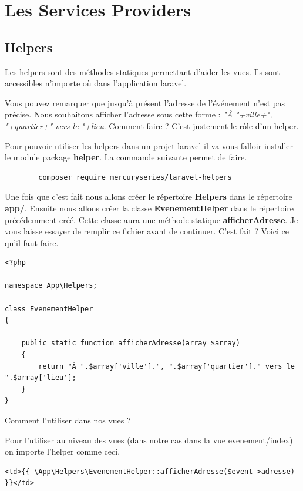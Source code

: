 \documentclass[12pt,a4paper]{article}
\begin{document}
\section{Les Services Providers}

\subsection{Helpers}
Les helpers sont des méthodes statiques permettant d'aider les vues. Ils sont accessibles n'importe où dans l'application laravel.\par
Vous pouvez remarquer que jusqu’à  présent l'adresse de l'événement n'est pas précise.
Nous souhaitons afficher l'adresse sous cette forme : \textit{"À "+ville+", "+quartier+" vers le "+lieu}. Comment faire ? C'est justement le rôle d'un helper.\par
Pour pouvoir utiliser les helpers dans un projet laravel il va vous falloir installer le module package \textbf{helper}. La commande suivante permet de faire.\\

\begin{verbatim}
        composer require mercuryseries/laravel-helpers
\end{verbatim}

Une fois que c'est fait nous allons créer le répertoire \textbf{Helpers} dans le répertoire
\textbf{app/}. Ensuite nous allons créer la classe \textbf{EvenementHelper} dans le répertoire précédemment créé.  Cette classe aura une méthode statique \textbf{afficherAdresse}.
Je vous laisse essayer de remplir ce fichier avant de continuer. C'est fait ? Voici ce qu'il faut faire.

\begin{verbatim}
<?php

namespace App\Helpers;

class EvenementHelper
{
    
    public static function afficherAdresse(array $array)
    {
        return "À ".$array['ville'].", ".$array['quartier']." vers le ".$array['lieu'];
    }
}
\end{verbatim}

Comment l'utiliser dans nos vues ?\par
Pour l'utiliser au niveau des vues (dans notre cas dans la vue evenement/index) on importe l'helper comme ceci.\\
\begin{verbatim}
<td>{{ \App\Helpers\EvenementHelper::afficherAdresse($event->adresse) }}</td>
\end{verbatim}
\end{document}
